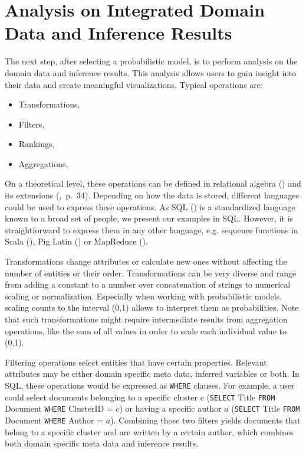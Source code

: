 \section{Analysis on Integrated Domain Data and Inference Results}

The next step, after selecting a probabilistic model, is to perform analysis on the domain data and inference results. This analysis allows users to gain insight into their data and create meaningful visualizations. Typical operations are:
\begin{itemize}
\item Transformations,
\item Filters,
\item Rankings,
\item Aggregations.
\end{itemize} On a theoretical level, these operations can be defined in relational algebra (\cite{ozsoyouglu1987extending, klug1982equivalence}) and its extensions (\cite{rajaraman2011mining},~p.~34). Depending on how the data is stored, different languages could be used to express these operations. As SQL (\cite{iso2011sql}) is a standardized language known to a broad set of people, we present our examples in SQL. However, it is straightforward to express them in any other language, e.g. sequence functions in Scala (\cite{odersky2008programming}), Pig Latin (\cite{gates2011programming}) or MapReduce (\cite{dean2008mapreduce}).

Transformations change attributes or calculate new ones without affecting the number of entities or their order. Transformations can be very diverse and range from adding a constant to a number over concatenation of strings to numerical scaling or normalization. Especially when working with probabilistic models, scaling counts to the interval (0,1) allows to interpret them as probabilities. Note that such transformations might require intermediate results from aggregation operations, like the sum of all values in order to scale each individual value to (0,1).

Filtering operations select entities that have certain properties. Relevant attributes may be either domain specific meta data, inferred variables or both. In SQL, these operations would be expressed as \texttt{WHERE} clauses. For example, a user could select documents belonging to a specific cluster $c$ (\texttt{SELECT} Title \texttt{FROM} Document \texttt{WHERE} ClusterID = $c$) or having a specific author $a$ (\texttt{SELECT} Title \texttt{FROM} Document \texttt{WHERE} Author = $a$). Combining those two filters yields documents that belong to a specific cluster and are written by a certain author, which combines both domain specific meta data and inference results.

